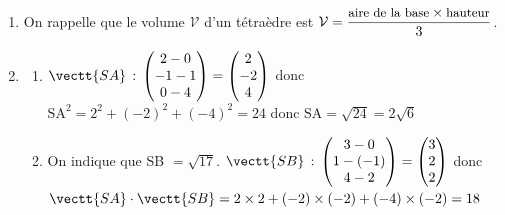 \begin{enumerate}
\begin{enumerate}
Donc: $2\left (2t\right ) + \left (1+t\right ) -\left (4-t\right )-3=0$, c'est-à-dire
$4t +1+t - 4 +t-3 =0$ soit $t=1$.

Pour $t=1$, on aura $x=2\times 1 = 2$,	$y=1+1=2$ et $z=4-1=3$.

Les coordonnées du point H sont donc $(2~;~2~;~3)$.
		
	\end{enumerate}
\item  On rappelle que le volume $\mathcal V$ d'un tétraèdre est $\mathcal V = \dfrac{\small \text{aire de la base} \times \text{hauteur}}{3}$.



\item  
	\begin{enumerate}
		\item 
		
		$\vectt{SA}\,:\,
\begin{pmatrix}
2-0 \\-1-1\\0-4
\end{pmatrix}
=
\begin{pmatrix}
2 \\-2\\4
\end{pmatrix}
$
donc
$\text{SA}^2 = 2^2+(-2)^2+(-4)^2=24$ donc $\text{SA}=\sqrt{24}=2\sqrt{6}$
		
		\item On indique que SB $= \sqrt{17}$. $\vectt{SB}\,:\,
\begin{pmatrix}
3-0 \\1-(-1)\\4-2
\end{pmatrix}
=
\begin{pmatrix}
3 \\2\\2
\end{pmatrix}$
donc
$\vectt{SA}\cdot \vectt{SB} = 2\times 2 + (-2)\times (-2) + (-4)\times (-2)=18$


\end{enumerate}
\end{enumerate}
